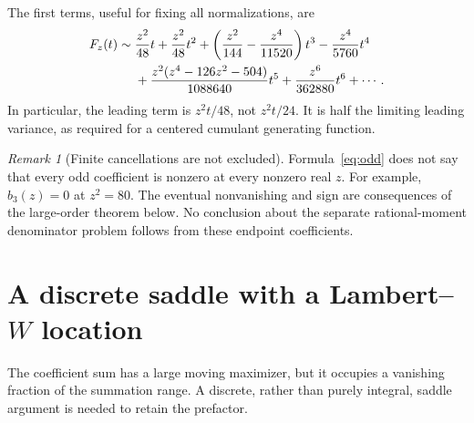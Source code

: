 \documentclass[11pt,a4paper]{article}
\numberwithin{equation}{section}
\theoremstyle{definition}
\theoremstyle{remark}
\newtheorem{remark}[theorem]{Remark}
\begin{document}
The first terms, useful for fixing all normalizations, are
\begin{align}
 F_z(t)\sim{}&\frac{z^2}{48}t+\frac{z^2}{48}t^2
 +\left(\frac{z^2}{144}-\frac{z^4}{11520}\right)t^3
 -\frac{z^4}{5760}t^4 \notag\\
 &+\frac{z^2(z^4-126z^2-504)}{1088640}t^5
 +\frac{z^6}{362880}t^6+\cdots.
 \label{eq:first}
\end{align}
In particular, the leading term is $z^2t/48$, not $z^2t/24$. It is half the limiting leading variance, as required for a centered cumulant generating function.

\begin{remark}[Finite cancellations are not excluded]
Formula~\eqref{eq:odd} does not say that every odd coefficient is nonzero at every nonzero real $z$. For example, $b_3(z)=0$ at $z^2=80$. The eventual nonvanishing and sign are consequences of the large-order theorem below. No conclusion about the separate rational-moment denominator problem follows from these endpoint coefficients.
\end{remark}

\section{A discrete saddle with a Lambert--\texorpdfstring{$W$}{W} location}
\label{sec:saddle}

The coefficient sum has a large moving maximizer, but it occupies a vanishing fraction of the summation range. A discrete, rather than purely integral, saddle argument is needed to retain the prefactor.
\end{document}
